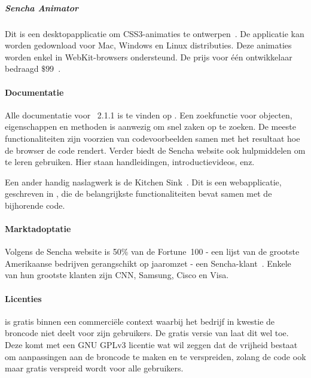 \subparagraph{Sencha Animator}
Dit is een desktopapplicatie om CSS3-animaties te ontwerpen~\cite{Sencha2012b}.  
De applicatie kan worden gedownload voor Mac, Windows en Linux distributies.
Deze animaties worden enkel in WebKit-browsers ondersteund.
De prijs voor één ontwikkelaar bedraagd $\$99$~\cite{Inc.}.

% 

\paragraph{Documentatie}
Alle documentatie voor \st{}~2.1.1 is te vinden op .  
Een zoekfunctie voor objecten,  eigenschappen en methoden is aanwezig om snel zaken op te zoeken.  
De meeste functionaliteiten zijn voorzien van codevoorbeelden samen met het resultaat hoe de browser de code rendert.  
Verder biedt de Sencha website ook hulpmiddelen om \st{} te leren gebruiken.  
Hier staan handleidingen, introductievideos, enz.

Een ander handig naslagwerk is de Kitchen Sink~\cite{Inc.2013}.  
Dit is een webapplicatie,  geschreven in \st{},  die de belangrijkste functionaliteiten bevat samen met de bijhorende code.  

\paragraph{Marktadoptatie}
Volgens de Sencha website is 50\% van de Fortune~100 - een lijst van de grootste Amerikaanse bedrijven gerangschikt op jaaromzet - een Sencha-klant~\cite{Inc.}.  
Enkele van hun grootste klanten zijn CNN,  Samsung,  Cisco en  Visa.

\paragraph{Licenties}
\st{} is gratis binnen een commerciële context waarbij het bedrijf in kwestie de broncode niet deelt voor zijn gebruikers.  
De gratis  versie van \st{} laat dit wel toe.  
Deze komt met een GNU GPLv3  licentie wat wil zeggen dat de vrijheid bestaat om aanpassingen aan de broncode te maken en te verspreiden,  zolang de code ook maar gratis verspreid wordt voor alle gebruikers.
  
